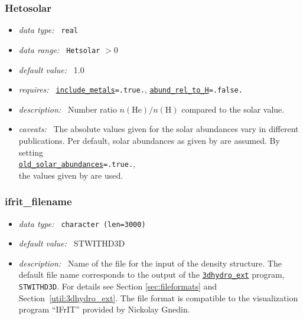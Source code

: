\documentclass[a4paper,10pt]{article}
\begin{document}
\subsubsection{Hetosolar}
\label{opt:hetosolar}
\begin{itemize}
 \item \textit{data type:~} \texttt{real}
 \item \textit{data range:~} \texttt{Hetsolar} $> 0$
 \item \textit{default value:~} 1.0
 \item \textit{requires:~} \texttt{\hyperref[opt:includemetals]{include\_metals}=.true.},
 \texttt{\hyperref[opt:abundreltoh]{abund\_rel\_to\_H}=.false.}
 \item \textit{description:~} Number ratio $n(\mathrm{He})/n(\mathrm{H})$ 
  compared to the solar value.
 \item \textit{caveats:~} The absolute values given for the solar abundances vary in
  different publications. Per default, solar abundances as given by 
  \cite{Asplund2009} are assumed. By setting \\
  \texttt{\hyperref[opt:oldsolarabundances]{old\_solar\_abundances}=.true.},\\ 
  the values given by \cite{Grevesse1998} are used.
\end{itemize}


\subsubsection{ifrit\_filename}
\label{opt:ifritfilename}
\begin{itemize}
 \item \textit{data type:~} \texttt{character (len=3000)}
 \item \textit{default value:~} STWITHD3D
 \item \textit{description:~} Name of the file for the input of the density 
  structure. The default file name corresponds to the output of the 
  \hyperref[util:3dhydro_ext]{\texttt{3dhydro\_ext}} program, \texttt{STWITHD3D}.
  For details see Section \ref{sec:fileformats} and 
  Section~\ref{util:3dhydro_ext}. 
  The file format is compatible to the visualization program 
``IFrIT'' provided by Nickolay Gnedin. 
\end{itemize}
\end{document}
